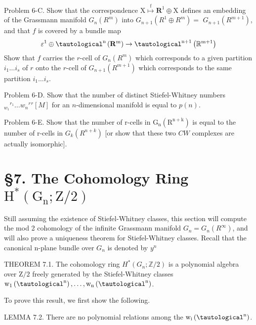 \documentclass[10pt]{article}
\begin{document}
Problem 6-C. Show that the correspondence $\mathrm{X} \stackrel{\mathrm{f}}{\mapsto} \mathbf{R}^{1} \oplus \mathrm{X}$ defines an embedding of the Grassmann manifold $G_{n}\left(R^{m}\right)$ into $G_{n+1}\left(R^{1} \oplus R^{m}\right)=$ $G_{n+1}\left(R^{m+1}\right)$, and that $f$ is covered by a bundle map
$$
\varepsilon^{1} \oplus \tautological^{\mathrm{n}}\left(\mathbf{R}^{\mathrm{m}}\right) \rightarrow \tautological^{\mathrm{n}+1}\left(\mathbb{R}^{\mathrm{m}+1}\right)
$$
Show that $f$ carries the $r$-cell of $G_{n}\left(R^{m}\right)$ which corresponds to a given partition $i_{1} \ldots i_{s}$ of $r$ onto the $r$-cell of $G_{n+1}\left(R^{m+1}\right)$ which corresponds to the same partition $i_{1} \ldots i_{s}$.

Problem 6-D. Show that the number of distinct Stiefel-Whitney numbers ${ }_{w_{1}}{ }^{r_{1}} \ldots w_{n}{ }^{r}{ }^{r}[M]$ for an $n$-dimensional manifold is equal to $p(n)$.

Problem 6-E. Show that the number of r-cells in $\mathrm{G}_{\mathrm{n}}\left(\mathrm{R}^{\mathrm{n}+\mathrm{k}}\right)$ is equal to the number of r-cells in $G_{k}\left(R^{n+k}\right)$ [or show that these two $C W$ complexes are actually isomorphic].

\section{§7. The Cohomology Ring $\mathrm{H}^{*}\left(\mathrm{G}_{\mathrm{n}} ; \mathrm{Z} / 2\right)$}
Still assuming the existence of Stiefel-Whitney classes, this section will compute the mod 2 cohomology of the infinite Grassmann manifold $G_{n}=G_{n}\left(R^{\infty}\right)$, and will also prove a uniqueness theorem for Stiefel-Whitney classes. Recall that the canonical n-plane bundle over $G_{n}$ is denoted by $y^{n}$

THEOREM 7.1. The cohomology ring $H^{*}\left(G_{n} ; \mathbb{Z} / 2\right)$ is a polynomial algebra over $\mathrm{Z} / 2$ freely generated by the Stiefel-Whitney classes $\mathrm{w}_{1}\left(\tautological^{\mathrm{n}}\right), \ldots, \mathrm{w}_{\mathrm{n}}\left(\tautological^{\mathrm{n}}\right)$.

To prove this result, we first show the following.

LEMMA 7.2. There are no polynomial relations among the $\mathrm{w}_{\mathrm{i}}\left(\tautological^{\mathrm{n}}\right)$.
\end{document}
